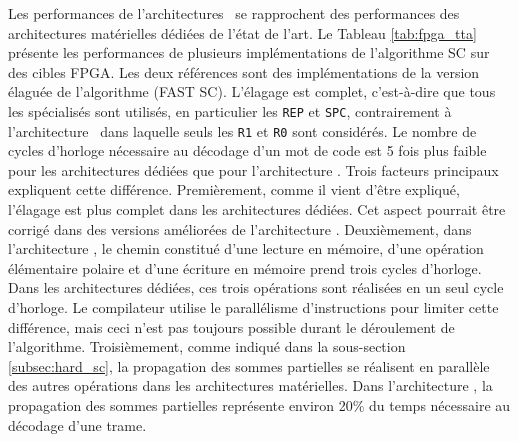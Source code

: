 Les performances de l'architectures \TTSC~se rapprochent des performances des architectures matérielles dédiées de l'état de l'art. Le Tableau \ref{tab:fpga_tta} présente les performances de plusieurs implémentations de l'algorithme SC sur des cibles FPGA. Les deux références \cite{sarkis_fast_2014,giard_638_2015} sont des implémentations de la version élaguée de l'algorithme (FAST SC). L'élagage est complet, c'est-à-dire que tous les \noeuds spécialisés sont utilisés, en particulier les \noeuds \texttt{REP} et \texttt{SPC}, contrairement à l'architecture \TTSC~dans laquelle seuls les \noeuds \texttt{R1} et \texttt{R0} sont considérés. Le nombre de cycles d'horloge nécessaire au décodage d'un mot de code est 5 fois plus faible pour les architectures dédiées que pour l'architecture \TTSC. Trois facteurs principaux expliquent cette différence. Premièrement, comme il vient d'être expliqué, l'élagage est plus complet dans les architectures dédiées. Cet aspect pourrait être corrigé dans des versions améliorées de l'architecture \TTSC. Deuxièmement, dans l'architecture \TTSC, le chemin constitué d'une lecture en mémoire, d'une opération élémentaire polaire et d'une écriture en mémoire prend trois cycles d'horloge. Dans les architectures dédiées, ces trois opérations sont réalisées en un seul cycle d'horloge. Le compilateur utilise le parallélisme d'instructions pour limiter cette différence, mais ceci n'est pas toujours possible durant le déroulement de l'algorithme. Troisièmement, comme indiqué dans la sous-section \ref{subsec:hard_sc}, la propagation des sommes partielles se réalisent en parallèle des autres opérations dans les architectures matérielles. Dans l'architecture \TTSC, la propagation des sommes partielles représente environ 20\% du temps nécessaire au décodage d'une trame.


